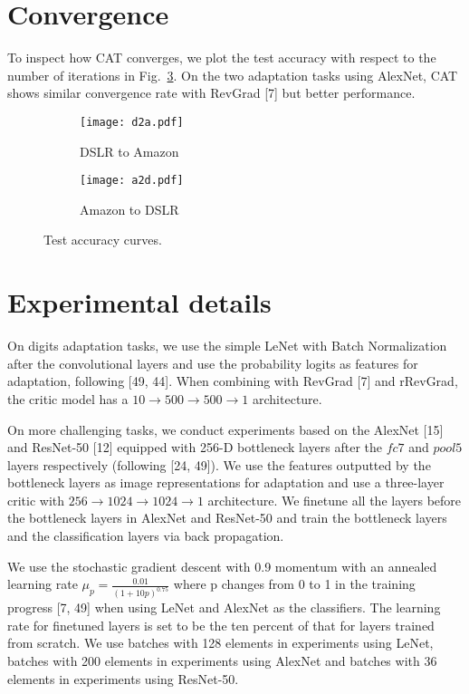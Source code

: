 \documentclass[10pt,twocolumn,letterpaper]{article}
\begin{document}
\section{Convergence}
To inspect how CAT converges, we plot the test accuracy with respect to the number of iterations in Fig.~\ref{fig:4}. On the two adaptation tasks using AlexNet, CAT shows similar convergence rate with RevGrad [7] but better performance.
\begin{figure}[t]
\centering
\begin{subfigure}{0.22\textwidth}
  \centering
  \texttt{[image: d2a.pdf]}
  \caption{DSLR to Amazon}
  \label{fig:4-1}
\end{subfigure}
\begin{subfigure}{0.22\textwidth}
  \centering
  \texttt{[image: a2d.pdf]}
  \caption{Amazon to DSLR}
  \label{fig:4-2}
\end{subfigure}
\vspace{-0.3cm}
\caption{Test accuracy curves.}\vspace{-0.6cm}
\label{fig:4}
\end{figure}



\section{Experimental details}
On digits adaptation tasks, we use the simple LeNet with Batch Normalization after the convolutional layers and use the probability logits as features for adaptation, following [49, 44]. When combining with RevGrad [7] and rRevGrad, the critic model has a $10\rightarrow500\rightarrow500\rightarrow1$ architecture.

On more challenging tasks, we conduct experiments based on the AlexNet [15] and ResNet-50 [12] equipped with 256-D bottleneck layers after the $fc7$ and $pool5$ layers respectively (following [24, 49]). We use the features outputted by the bottleneck layers as image representations for adaptation and use a three-layer critic with $256\rightarrow1024\rightarrow1024\rightarrow1$ architecture. We finetune all the layers before the bottleneck layers in AlexNet and ResNet-50 and train the bottleneck layers and the classification layers via back propagation.

We use the stochastic gradient descent with 0.9 momentum with an annealed learning rate $\mu_p=\frac{0.01}{(1+10p)^{0.75}}$ where p changes from 0 to 1 in the training progress [7, 49] when using LeNet and AlexNet as the classifiers. The learning rate for finetuned layers is set to be the ten percent of that for layers trained from scratch. We use batches with 128 elements in experiments using LeNet, batches with 200 elements in experiments using AlexNet and batches with 36 elements in experiments using ResNet-50.
\end{document}
